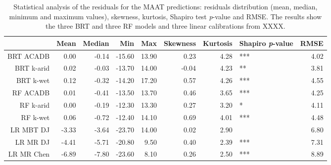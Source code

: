 \begin{table}[ht]
\centering
\caption{Statistical analysis of the residuals for the MAAT predictions: residuals distribution (mean, median, minimum and maximum values), skewness, kurtosis, Shapiro test \textit{p}-value and RMSE. The results show the three BRT and three RF models and three linear calibrations from XXXX.} 
\label{SI_Table_res}
\begin{tabular}{rrrrrrrlr}
  \toprule
 & Mean & Median & Min & Max & Skewness & Kurtosis & Shapiro \textit{p}-value & RMSE \\ 
  \midrule
BRT ACADB & 0.00 & -0.14 & -15.60 & 13.90 & 0.23 & 4.28 & *** & 4.02 \\ 
  BRT k-arid & 0.02 & -0.03 & -13.70 & 14.00 & -0.04 & 4.23 & ** & 3.81 \\ 
  BRT k-wet & 0.12 & -0.32 & -14.20 & 17.20 & 0.57 & 4.26 & *** & 4.55 \\ 
  RF ACADB & 0.01 & -0.41 & -13.50 & 13.70 & 0.46 & 3.65 & *** & 4.25 \\ 
  RF k-arid & 0.00 & -0.19 & -12.30 & 13.30 & 0.27 & 3.20 & * & 4.11 \\ 
  RF k-wet & 0.06 & -0.72 & -12.40 & 14.10 & 0.69 & 4.01 & *** & 4.48 \\ 
  LR MBT DJ & -3.33 & -3.64 & -23.70 & 14.00 & 0.02 & 2.90 &   & 6.80 \\ 
  LR MR DJ & -4.41 & -5.71 & -20.80 & 9.50 & 0.40 & 2.39 & *** & 7.31 \\ 
  LR MR Chen & -6.89 & -7.80 & -23.60 & 8.10 & 0.26 & 2.50 & *** & 8.89 \\ 
   \bottomrule
\end{tabular}
\end{table}
